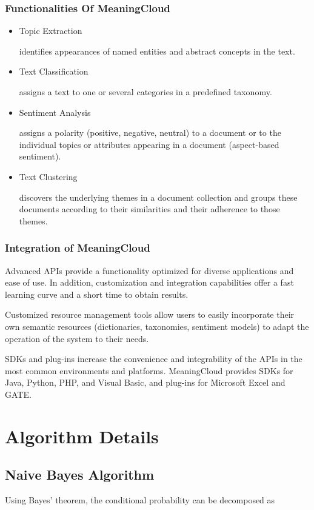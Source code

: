 \documentclass[oneside,a4paper,12pt]{book}
\begin{document}
\subsubsection{Functionalities Of MeaningCloud}
\begin{itemize}
    \item Topic Extraction
    \par identifies appearances of named entities and abstract concepts in the text.
    \item Text Classification
    \par assigns a text to one or several categories in a predefined taxonomy.
    \item Sentiment Analysis
    \par assigns a polarity (positive, negative, neutral) to a document or to the individual topics or attributes appearing in a document (aspect-based sentiment).
    \item Text Clustering
    \par discovers the underlying themes in a document collection and groups these documents according to their similarities and their adherence to those themes.
\end{itemize}
\subsubsection{Integration of MeaningCloud}
\par Advanced APIs provide a functionality optimized for diverse applications and ease of use. In addition, customization and integration capabilities offer a fast learning curve and a short time to obtain results. \par
Customized resource management tools allow users to easily incorporate their own semantic resources (dictionaries, taxonomies, sentiment models) to adapt the operation of the system to their needs.\par 
SDKs and plug-ins increase the convenience and integrability of the APIs in the most common environments and platforms. MeaningCloud provides SDKs for Java, Python, PHP, and Visual Basic, and plug-ins for Microsoft Excel and GATE.
\section{Algorithm Details}
\subsection{Naive Bayes Algorithm}
Using Bayes' theorem, the conditional probability can be decomposed as \newline
\end{document}

